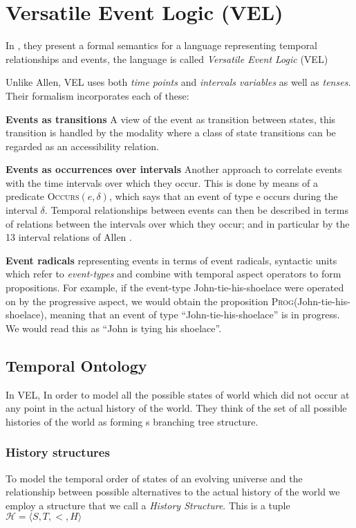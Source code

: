 \section{Versatile Event Logic (VEL)}
In \cite{bennett2001unifying}, they present a formal semantics for a language representing temporal relationships and events, the language is called \textit{Versatile Event Logic }(VEL)

Unlike Allen, VEL uses both \textit{time points} and \textit{intervals variables} as well as \textit{tenses}.
Their formalism incorporates each of these:


\textbf{Events as transitions} A view of the event as transition between states, this transition is handled by the modality
where a class of state transitions can be regarded as an accessibility relation.

\textbf{Events as occurrences over intervals}
Another approach to correlate events with the time intervals over which they occur.
This is done by means of a predicate \textsc{Occurs}$(e, \delta)$, which says that an event of type e occurs during
the interval $\delta$. Temporal relationships between events can then be described in terms of
relations between the intervals over which they occur; and in particular by the 13 interval
relations of Allen \cite{allen1984towards}.

\textbf{Event radicals} representing events in terms of event radicals, syntactic
units which refer to \textit{event-types} and combine with temporal aspect operators to form
propositions. For example, if the event-type John-tie-his-shoelace were operated on by the
progressive aspect, we would obtain the proposition \textsc{Prog}(John-tie-his-shoelace), meaning
that an event of type ``John-tie-his-shoelace'' is in progress. We would read this as ``John is
tying his shoelace''.


\subsection{Temporal Ontology}
In VEL, In order to model all the possible states of world which did not occur at any point in the actual
history of the world. They think of the set of all possible histories of the world as forming s branching tree structure.

\subsubsection{History structures}
To model the temporal order of states of an evolving universe and the relationship
between possible alternatives to the actual history of the world we employ a structure that
we call a \textit{History Structure}. This is a tuple $\mathcal{H} = \langle S, T, <, H \rangle$

